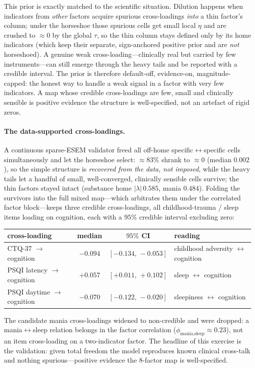 This prior is exactly matched to the scientific situation. Dilution happens when
indicators from \emph{other} factors acquire spurious cross-loadings \emph{into} a thin
factor's column; under the horseshoe those spurious cells get small local $\eta$ and are
crushed to $\approx 0$ by the global $\tau$, so the thin column stays defined only by its
home indicators (which keep their separate, sign-anchored positive prior and are
\emph{not} horseshoed). A genuine weak cross-loading---clinically real but carried by few
instruments---can still emerge through the heavy tails and be reported with a credible
interval. The prior is therefore default-off, evidence-on, magnitude-capped: the honest
way to handle a weak signal in a factor with very few indicators. A map whose credible
cross-loadings are few, small and clinically sensible is positive evidence the structure
is well-specified, not an artefact of rigid zeros.

\paragraph{The data-supported cross-loadings.} A continuous sparse-ESEM validator freed all
off-home specific$\leftrightarrow$specific cells simultaneously and let the horseshoe
select: $\approx 83\%$ shrank to $\approx 0$ (median $0.002$), so the simple structure is
\emph{recovered from the data, not imposed}, while the heavy tails let a handful of small,
well-converged, clinically sensible cells survive; the thin factors stayed intact
(substance home $|\lambda|\,0.585$, mania $0.484$). Folding the survivors into the full
mixed map---which arbitrates them under the correlated factor block---keeps three
credible cross-loadings, all childhood-trauma / sleep items loading on cognition, each
with a $95\%$ credible interval excluding zero:
\begin{center}\small
\begin{tabular}{lccl}
\toprule
cross-loading & median & $95\%$ CI & reading \\
\midrule
CTQ-37 $\to$ cognition            & $-0.094$ & $[-0.134,\,-0.053]$ & childhood adversity $\leftrightarrow$ cognition \\
PSQI latency $\to$ cognition      & $+0.057$ & $[+0.011,\,+0.102]$ & sleep $\leftrightarrow$ cognition \\
PSQI daytime $\to$ cognition      & $-0.070$ & $[-0.122,\,-0.020]$ & sleepiness $\leftrightarrow$ cognition \\
\bottomrule
\end{tabular}
\end{center}
The candidate mania cross-loadings widened to non-credible and were dropped: a
mania$\leftrightarrow$sleep relation belongs in the factor correlation
($\phi_{\text{mania,sleep}}\approx 0.23$), not an item cross-loading on a two-indicator
factor. The headline of this exercise is the validation: given total freedom the model
reproduces known clinical cross-talk and nothing spurious---positive evidence the
8-factor map is well-specified.

